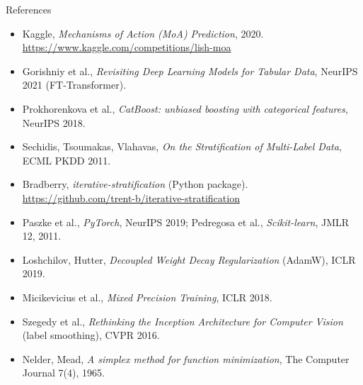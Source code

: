 \documentclass[9pt,aspectratio=169]{beamer}
\begin{document}
\begin{frame}{References}
  \scriptsize
  \begin{itemize}
    \item Kaggle, \emph{Mechanisms of Action (MoA) Prediction}, 2020. \url{https://www.kaggle.com/competitions/lish-moa}
    \item Gorishniy et al., \emph{Revisiting Deep Learning Models for Tabular Data}, NeurIPS 2021 (FT-Transformer).
    \item Prokhorenkova et al., \emph{CatBoost: unbiased boosting with categorical features}, NeurIPS 2018.
    \item Sechidis, Tsoumakas, Vlahavas, \emph{On the Stratification of Multi-Label Data}, ECML PKDD 2011.
    \item Bradberry, \emph{iterative-stratification} (Python package). \url{https://github.com/trent-b/iterative-stratification}
    \item Paszke et al., \emph{PyTorch}, NeurIPS 2019; Pedregosa et al., \emph{Scikit-learn}, JMLR 12, 2011.
    \item Loshchilov, Hutter, \emph{Decoupled Weight Decay Regularization} (AdamW), ICLR 2019.
    \item Micikevicius et al., \emph{Mixed Precision Training}, ICLR 2018.
    \item Szegedy et al., \emph{Rethinking the Inception Architecture for Computer Vision} (label smoothing), CVPR 2016.
    \item Nelder, Mead, \emph{A simplex method for function minimization}, The Computer Journal 7(4), 1965.
  \end{itemize}
\end{frame}
\end{document}
